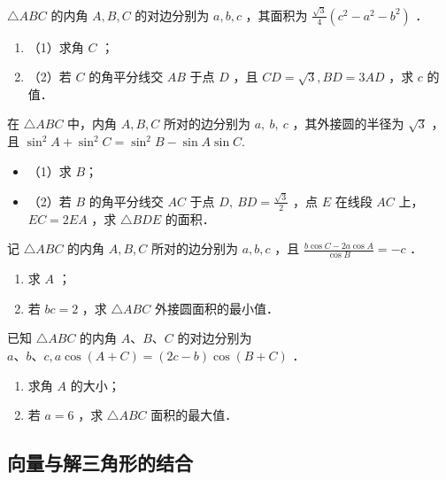\begin{problem}
$\triangle A B C$ 的内角 $A, B, C$ 的对边分别为 $a, b, c$ ，其面积为 $\frac{\sqrt{3}}{4}\left(c^2-a^2-b^2\right)$ ．
\begin{enumerate}
    \item （1）求角 $C$ ；
    \item （2）若 $C$ 的角平分线交 $A B$ 于点 $D$ ，且 $C D=\sqrt{3}, B D=3 A D$ ，求 $c$ 的值．
\end{enumerate}
\end{problem}
\vspace{4em}

\begin{problem}
在 $\triangle A B C$ 中，内角 $A, B, C$ 所对的边分别为 $a, ~ b, ~ c$ ，其外接圆的半径为 $\sqrt{3}$ ，且 $\sin ^2 A+\sin ^2 C=\sin ^2 B-\sin A \sin C$.
\begin{itemize}
    \item （1）求 $B$；
    \item （2）若 $B$ 的角平分线交 $A C$ 于点 $D, ~ B D=\frac{\sqrt{3}}{2}$ ，点 $E$ 在线段 $A C$ 上，$E C=2 E A$ ，求 $\triangle B D E$ 的面积．
\end{itemize}
\end{problem}
\vspace{4em}

\begin{example}
    记 $\triangle A B C$ 的内角 $A, B, C$ 所对的边分别为 $a, b, c$ ，且 $\frac{b \cos C-2 a \cos A}{\cos B}=-c$ ．
    \begin{enumerate}
        \item 求 $A$ ；
        \item 若 $b c=2$ ，求 $\triangle A B C$ 外接圆面积的最小值．
    \end{enumerate}
\end{example}
\vspace{4em}


\begin{example}
    已知 $\triangle A B C$ 的内角 $A 、 B 、 C$ 的对边分别为 $a 、 b 、 c, a \cos (A+C)=(2 c-b) \cos (B+C)$ ．
    \begin{enumerate}
        \item 求角 $A$ 的大小；
        \item 若 $a=6$ ，求 $\triangle A B C$ 面积的最大值．
    \end{enumerate}
\end{example}
\vspace{4em}

\subsection{向量与解三角形的结合}

